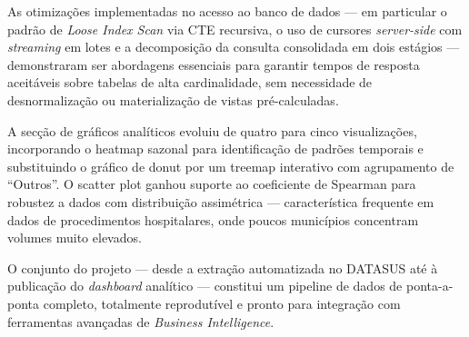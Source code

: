 \documentclass[12pt,a4paper]{report}
\begin{document}
As otimizações implementadas no acesso ao banco de dados — em particular o padrão de
\textit{Loose Index Scan} via CTE recursiva, o uso de cursores \textit{server-side}
com \textit{streaming} em lotes e a decomposição da consulta consolidada em dois
estágios — demonstraram ser abordagens essenciais para garantir tempos de resposta
aceitáveis sobre tabelas de alta cardinalidade, sem necessidade de desnormalização ou
materialização de vistas pré-calculadas.

A secção de gráficos analíticos evoluiu de quatro para cinco visualizações,
incorporando o heatmap sazonal para identificação de padrões temporais e substituindo
o gráfico de donut por um treemap interativo com agrupamento de ``Outros''. O scatter
plot ganhou suporte ao coeficiente de Spearman para robustez a dados com distribuição
assimétrica — característica frequente em dados de procedimentos hospitalares, onde
poucos municípios concentram volumes muito elevados.

O conjunto do projeto — desde a extração automatizada no DATASUS até à publicação
do \textit{dashboard} analítico — constitui um pipeline de dados de ponta-a-ponta
completo, totalmente reprodutível e pronto para integração com ferramentas avançadas
de \textit{Business Intelligence}.
\end{document}
